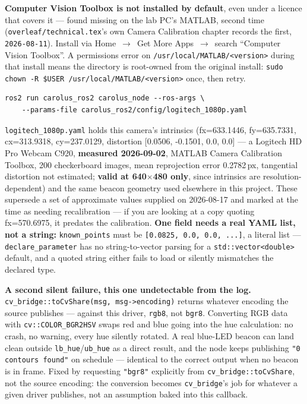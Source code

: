 \documentclass[11pt]{report}
\newenvironment{warningbox}%
  {\begin{lrbox}{\warnbox}\begin{minipage}{0.90\textwidth}}%
  {\end{minipage}\end{lrbox}%
   \begin{center}\fcolorbox{black}{codebg}{\usebox{\warnbox}}\end{center}}
\begin{document}
\begin{warningbox}
\textbf{Computer Vision Toolbox is not installed by default}, even under a
licence that covers it --- found missing on the lab PC's MATLAB, second time
(\texttt{overleaf/technical.tex}'s own Camera Calibration chapter records the
first, \texttt{2026-08-11}). Install via Home~$\to$~Get More Apps~$\to$~search
``Computer Vision Toolbox''. A permissions error on
\texttt{/usr/local/MATLAB/<version>} during that install means the directory
is root-owned from the original install: \texttt{sudo chown -R \$USER
/usr/local/MATLAB/<version>} once, then retry.
\end{warningbox}

\begin{lstlisting}[style=shell]
ros2 run carolus_ros2 carolus_node --ros-args \
    --params-file carolus_ros2/config/logitech_1080p.yaml
\end{lstlisting}

\texttt{logitech\_1080p.yaml} holds this camera's intrinsics
(fx=633.1446, fy=635.7331, cx=313.9318, cy=237.0129, distortion
[0.0506, -0.1501, 0.0, 0.0] --- a Logitech HD Pro Webcam C920,
\textbf{measured 2026-09-02}, MATLAB Camera Calibration Toolbox, 200
checkerboard images, mean reprojection error 0.2782\,px, tangential
distortion not estimated; \textbf{valid at 640$\times$480 only}, since
intrinsics are resolution-dependent) and the same beacon geometry used
elsewhere in this project. These supersede a set of approximate values
supplied on 2026-08-17 and marked at the time as needing recalibration ---
if you are looking at a copy quoting fx=570.6975, it predates the
calibration.
\textbf{One field needs a real YAML list, not a string:}
\texttt{known\_points} must be \texttt{[0.0825, 0.0, 0.0, ...]}, a literal
list --- \texttt{declare\_parameter} has no string-to-vector parsing for a
\texttt{std::vector<double>} default, and a quoted string either fails to
load or silently mismatches the declared type.

\begin{warningbox}
\textbf{A second silent failure, this one undetectable from the log.}
\texttt{cv\_bridge::\allowbreak toCvShare(msg,\allowbreak\ msg->encoding)}
returns whatever encoding
the source publishes --- against this driver, \texttt{rgb8}, not
\texttt{bgr8}. Converting RGB data with \texttt{cv::COLOR\_BGR2HSV} swaps red
and blue going into the hue calculation: no crash, no warning, every hue
silently rotated. A real blue-LED beacon can land clean outside
\texttt{lb\_hue}/\texttt{ub\_hue} as a direct result, and the node keeps
publishing \texttt{"0 contours found"} on schedule --- identical to the
correct output when no beacon is in frame. Fixed by requesting
\texttt{"bgr8"} explicitly from \texttt{cv\_bridge::toCvShare}, not the
source encoding: the conversion becomes \texttt{cv\_bridge}'s job for
whatever a given driver publishes, not an assumption baked into this
callback.
\end{warningbox}
\end{document}
